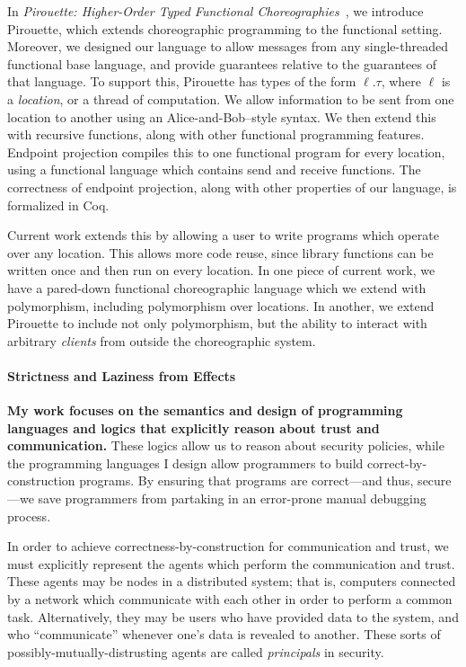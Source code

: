 \documentclass{article}
\theoremstyle{definition}
\begin{document}
In \textit{Pirouette: Higher-Order Typed Functional Choreographies}~\citep{HirschG22}, we introduce Pirouette, which extends choreographic programming to the functional setting.
Moreover, we designed our language to allow messages from any single-threaded functional base language, and provide guarantees relative to the guarantees of that language.
To support this, Pirouette has types of the form $\ell.\tau$, where $\ell$ is a \emph{location}, or a thread of computation.
We allow information to be sent from one location to another using an Alice-and-Bob--style syntax.
We then extend this with recursive functions, along with other functional programming features.
Endpoint projection compiles this to one functional program for every location, using a functional language which contains send and receive functions.
The correctness of endpoint projection, along with other properties of our language, is formalized in Coq.

Current work extends this by allowing a user to write programs which operate over any location.
This allows more code reuse, since library functions can be written once and then run on every location.
In one piece of current work, we have a pared-down functional choreographic language which we extend with polymorphism, including polymorphism over locations.
In another, we extend Pirouette to include not only polymorphism, but the ability to interact with arbitrary \emph{clients} from outside the choreographic system.


\paragraph{Strictness and Laziness from Effects}


\iffalse
\textbf{My work focuses on the semantics and design of programming languages and logics that explicitly reason about trust and communication.}
These logics allow us to reason about security policies, while the programming languages I design allow programmers to build correct-by-construction programs.
By ensuring that programs are correct---and thus, secure---we save programmers from partaking in an error-prone manual debugging process.

In order to achieve correctness-by-construction for communication and trust, we must explicitly represent the agents which perform the communication and trust.
These agents may be nodes in a distributed system; that is, computers connected by a network which communicate with each other in order to perform a common task.
Alternatively, they may be users who have provided data to the system, and who ``communicate'' whenever one's data is revealed to another.
These sorts of possibly-mutually-distrusting agents are called \emph{principals} in security.
\end{document}

